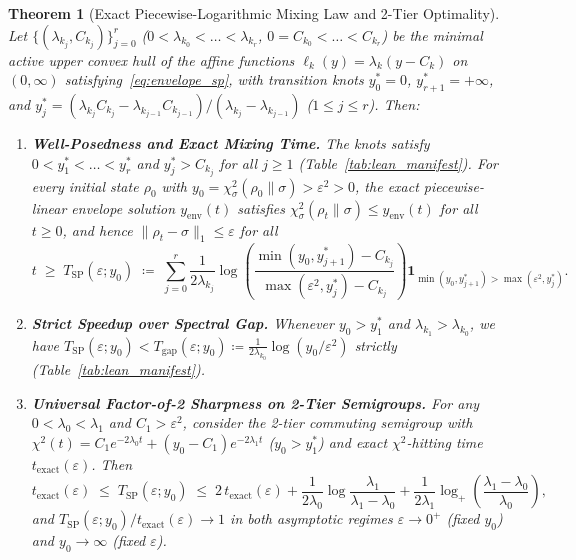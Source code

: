 \documentclass[11pt,a4paper]{article}
\newtheorem{theorem}{Theorem}[section]
\theoremstyle{definition}
\begin{document}
\begin{theorem}[Exact Piecewise-Logarithmic Mixing Law and 2-Tier Optimality]
\label{thm:hull_mixing}
Let $\{(\lambda_{k_j}, C_{k_j})\}_{j=0}^r$ ($0 < \lambda_{k_0} < \dots < \lambda_{k_r}$, $0 = C_{k_0} < \dots < C_{k_r}$) be the minimal active upper convex hull of the affine functions $\ell_k(y) = \lambda_k(y - C_k)$ on $(0, \infty)$ satisfying~\eqref{eq:envelope_sp}, with transition knots $y_0^* = 0$, $y_{r+1}^* = +\infty$, and $y_j^* = (\lambda_{k_j} C_{k_j} - \lambda_{k_{j-1}} C_{k_{j-1}})/(\lambda_{k_j} - \lambda_{k_{j-1}})$ ($1 \le j \le r$). Then:
\begin{enumerate}[label=(\alph*),leftmargin=2em,itemsep=2pt]
  \item \textbf{Well-Posedness and Exact Mixing Time.} The knots satisfy $0 < y_1^* < \dots < y_r^*$ and $y_j^* > C_{k_j}$ for all $j \ge 1$ (Table~\ref{tab:lean_manifest}). For every initial state $\rho_0$ with $y_0 = \chi^2_\sigma(\rho_0\|\sigma) > \varepsilon^2 > 0$, the exact piecewise-linear envelope solution $y_{\mathrm{env}}(t)$ satisfies $\chi^2_\sigma(\rho_t\|\sigma) \le y_{\mathrm{env}}(t)$ for all $t \ge 0$, and hence $\|\rho_t - \sigma\|_1 \le \varepsilon$ for all
  \begin{equation}
    t \;\ge\; T_{\mathrm{SP}}(\varepsilon; y_0) \;\coloneqq\;
    \sum_{j=0}^{r} \frac{1}{2\lambda_{k_j}}
    \log\!\left(\frac{\min(y_0, y_{j+1}^*) - C_{k_j}}{\max(\varepsilon^2, y_j^*) - C_{k_j}}\right)
    \mathbf{1}_{\min(y_0, y_{j+1}^*) > \max(\varepsilon^2, y_j^*)}.
    \label{eq:T_sp_exact}
  \end{equation}
  \item \textbf{Strict Speedup over Spectral Gap.} Whenever $y_0 > y_1^*$ and $\lambda_{k_1} > \lambda_{k_0}$, we have $T_{\mathrm{SP}}(\varepsilon; y_0) < T_{\mathrm{gap}}(\varepsilon; y_0) \coloneqq \frac{1}{2\lambda_{k_0}}\log(y_0/\varepsilon^2)$ strictly (Table~\ref{tab:lean_manifest}).
  \item \textbf{Universal Factor-of-2 Sharpness on 2-Tier Semigroups.} For any $0 < \lambda_0 < \lambda_1$ and $C_1 > \varepsilon^2$, consider the 2-tier commuting semigroup with $\chi^2(t) = C_1 e^{-2\lambda_0 t} + (y_0 - C_1) e^{-2\lambda_1 t}$ ($y_0 > y_1^*$) and exact $\chi^2$-hitting time $t_{\mathrm{exact}}(\varepsilon)$. Then
  \begin{equation}
    t_{\mathrm{exact}}(\varepsilon) \;\le\; T_{\mathrm{SP}}(\varepsilon; y_0)
    \;\le\; 2\, t_{\mathrm{exact}}(\varepsilon)
    + \frac{1}{2\lambda_0}\log\frac{\lambda_1}{\lambda_1 - \lambda_0}
    + \frac{1}{2\lambda_1}\log_+\!\left(\frac{\lambda_1 - \lambda_0}{\lambda_0}\right),
    \label{eq:sharp_2tier}
  \end{equation}
  and $T_{\mathrm{SP}}(\varepsilon; y_0) / t_{\mathrm{exact}}(\varepsilon) \to 1$ in both asymptotic regimes $\varepsilon \to 0^+$ (fixed $y_0$) and $y_0 \to \infty$ (fixed $\varepsilon$).
\end{enumerate}
\end{theorem}
\end{document}
